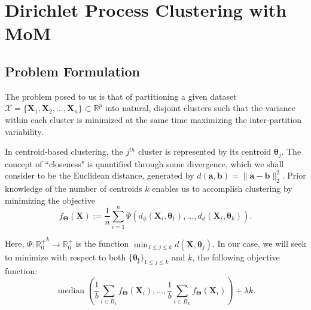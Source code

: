 \documentclass{article}
\newcommand{\bX}{\boldsymbol{X}}
\begin{document}

\section{Dirichlet Process Clustering with MoM}

\subsection{Problem Formulation}
The problem posed to us is that of partitioning a given dataset $\mathcal{X} = \{\bX_1, \bX_2, \ldots, \bX_n\}\subset \mathbb{R}^p$ into natural, disjoint clusters such that the variance within each cluster is minimized at the same time maximizing the inter-partition variability. 


In centroid-based clustering, the $j^{th}$ cluster is represented by its centroid $\boldsymbol{\theta}_j$. The concept of ``closeness" is quantified through some divergence, which we shall consider to be the Euclidean distance, generated by $d(\boldsymbol{a},\boldsymbol{b})=\|\boldsymbol{a} - \boldsymbol{b}\|_2^2$. Prior knowledge of the number of centroids $k$ enables us to accomplish clustering by minimizing the objective
\begin{equation}\label{ob}
    f_{\boldsymbol{\Theta}}(\boldsymbol{X}) := \frac{1}{n} \sum_{i=1}^n \Psi\left(d_\phi\left(\boldsymbol{X}_i, \boldsymbol{\theta}_1\right), \ldots, d_\phi\left(\boldsymbol{X}_i, \boldsymbol{\theta}_k\right)\right).
\end{equation}

Here, $\Psi: {\mathbb{R}^{+}_0}^k \rightarrow \mathbb{R}^{+}_0$ is the function $\min_{1\le j\le k} d(\bm{X},\bm{\theta}_j)$. In our case, we will seek to minimize with respect to both $\{\bm{\theta_j}\}_{1\le j\le k}$ and $k$, the following objective function:
\begin{equation}\label{obj}
    \operatorname{median}\left(\frac{1}{b} \sum_{i \in B_1} f_{\boldsymbol{\Theta}}\left(\boldsymbol{X}_i\right), \ldots, \frac{1}{b} \sum_{i \in B_L} f_{\boldsymbol{\Theta}}\left(\boldsymbol{X}_i\right)\right) + \lambda k.
\end{equation}
\end{document}
